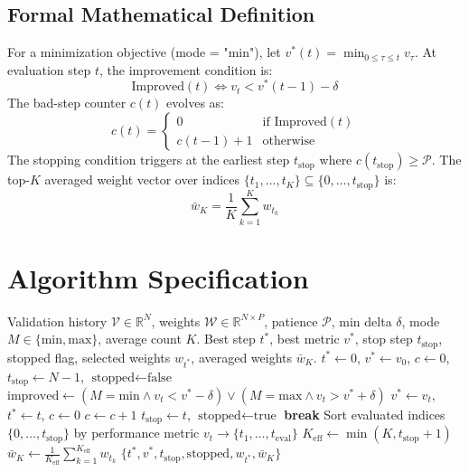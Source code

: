 \documentclass[11pt,a4paper]{article}
\theoremstyle{definition}
\begin{document}
\subsection{Formal Mathematical Definition}
For a minimization objective (mode = "min"), let $v^*(t) = \min_{0 \le \tau \le t} v_\tau$.
At evaluation step $t$, the improvement condition is:
\begin{equation}
\text{Improved}(t) \iff v_t < v^*(t-1) - \delta
\end{equation}
The bad-step counter $c(t)$ evolves as:
\begin{equation}
c(t) = \begin{cases} 0 & \text{if } \text{Improved}(t) \\ c(t-1) + 1 & \text{otherwise} \end{cases}
\end{equation}
The stopping condition triggers at the earliest step $t_{\text{stop}}$ where $c(t_{\text{stop}}) \ge \mathcal{P}$.
The top-$K$ averaged weight vector over indices $\{t_1, \dots, t_K\} \subseteq \{0, \dots, t_{\text{stop}}\}$ is:
\begin{equation}
\bar{w}_K = \frac{1}{K} \sum_{k=1}^K w_{t_k}
\end{equation}

\section{Algorithm Specification}

\begin{algorithm}[H]
\caption{Early Stopping and Checkpoint Averaging Execution}
\label{alg:early_stopping}
\begin{algorithmic}[1]
\Require Validation history $\mathcal{V} \in \mathbb{R}^N$, weights $\mathcal{W} \in \mathbb{R}^{N \times P}$, patience $\mathcal{P}$, min delta $\delta$, mode $M \in \{\text{min}, \text{max}\}$, average count $K$.
\Ensure Best step $t^*$, best metric $v^*$, stop step $t_{\text{stop}}$, stopped flag, selected weights $w_{t^*}$, averaged weights $\bar{w}_K$.
\State $t^* \gets 0$, $v^* \gets v_0$, $c \gets 0$, $t_{\text{stop}} \gets N - 1$, $\text{stopped} \gets \text{false}$
    \State $\text{improved} \gets (M = \text{min} \land v_t < v^* - \delta) \lor (M = \text{max} \land v_t > v^* + \delta)$
        \State $v^* \gets v_t$, $t^* \gets t$, $c \gets 0$
    \Else
        \State $c \gets c + 1$
            \State $t_{\text{stop}} \gets t$, $\text{stopped} \gets \text{true}$
            \State \textbf{break}
        \EndIf
    \EndIf
\EndFor
\State Sort evaluated indices $\{0, \dots, t_{\text{stop}}\}$ by performance metric $v_t \to \{t_1, \dots, t_{\text{eval}}\}$
\State $K_{\text{eff}} \gets \min(K, t_{\text{stop}} + 1)$
\State $\bar{w}_K \gets \frac{1}{K_{\text{eff}}} \sum_{k=1}^{K_{\text{eff}}} w_{t_k}$
\State \Return $\{t^*, v^*, t_{\text{stop}}, \text{stopped}, w_{t^*}, \bar{w}_K\}$
\end{algorithmic}
\end{algorithm}
\end{document}
